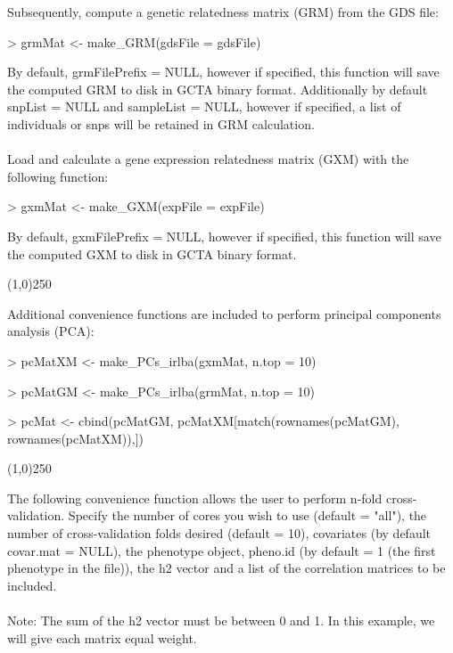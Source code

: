 \documentclass[a4paper]{article}
\begin{document}
Subsequently, compute a genetic relatedness matrix (GRM) from the GDS file: 
\begin{Schunk}
\begin{Sinput}
> grmMat <- make_GRM(gdsFile = gdsFile)
\end{Sinput}
\end{Schunk}
By default, grmFilePrefix = NULL, however if specified, this function will save the computed GRM to disk in GCTA binary format. Additionally by default snpList = NULL and sampleList = NULL, however if specified, a list of individuals or snps will be retained in GRM calculation.
\\
\\
Load and calculate a gene expression relatedness matrix (GXM) with the following function:
\begin{Schunk}
\begin{Sinput}
> gxmMat <- make_GXM(expFile = expFile)
\end{Sinput}
\end{Schunk}
By default, gxmFilePrefix = NULL, however if specified, this function will save the computed GXM to disk in GCTA binary format.
\begin{center}
\line(1,0){250}
\end{center}
Additional convenience functions are included to perform principal components analysis (PCA):
\begin{Schunk}
\begin{Sinput}
> pcMatXM <- make_PCs_irlba(gxmMat, n.top = 10)

> pcMatGM <- make_PCs_irlba(grmMat, n.top = 10)

> pcMat <- cbind(pcMatGM, pcMatXM[match(rownames(pcMatGM), rownames(pcMatXM)),])
\end{Sinput}
\end{Schunk}
\begin{center}
\line(1,0){250}
\end{center}
The following convenience function allows the user to perform n-fold cross-validation. Specify the number of cores you wish to use (default = "all"), the number of cross-validation folds desired (default = 10), covariates (by default covar.mat = NULL), the phenotype object, pheno.id (by default = 1 (the first phenotype in the file)), the h2 vector and a list of the correlation matrices to be included.
 \\
\\
Note: The sum of the h2 vector must be between 0 and 1. In this example, we will give each matrix equal weight.
\end{document}
